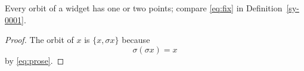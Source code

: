 
\begin{lemma}[Orbits]\label{sy-0002}
Every orbit of a widget has one or two points; compare \eqref{eq:fix} in Definition~\ref{sy-0001}.
\end{lemma}
\begin{proof}
The orbit of $x$ is $\{x, \sigma x\}$ because
\begin{equation}\label{eq:step}
\sigma(\sigma x) = x
\end{equation}
by \eqref{eq:prose}.
\end{proof}

